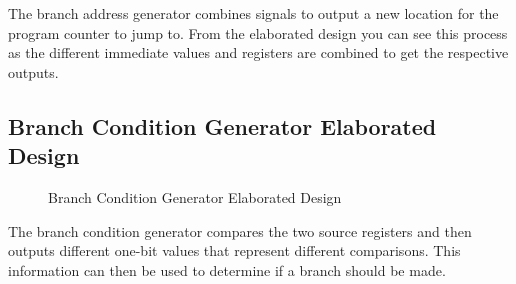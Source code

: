 \documentclass[
    a4paper, %
	12pt, %
    ]{CSSullivanBusinessReport}
\begin{document}
\begin{fullwidth}
The branch address generator combines signals to output a new location for the program counter to jump to. From the elaborated design you can see this process as the different immediate values and registers are combined to get the respective outputs.
\subsection{Branch Condition Generator Elaborated Design} %
\begin{figure}[H]
    \centering
    \captionsetup{style=widetable}
    \caption{Branch Condition Generator Elaborated Design}
    \label{fig:conditionDesign}
\end{figure}

The branch condition generator compares the two source registers and then outputs different one-bit values that represent different comparisons. This information can then be used to determine if a branch should be made. 


\end{fullwidth}
\end{document}
